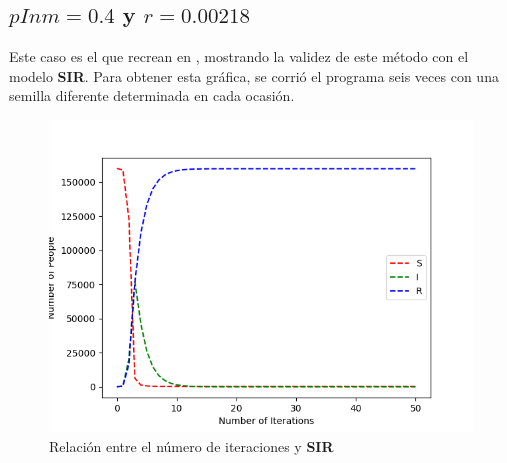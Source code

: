\documentclass[twoside,twocolumn]{article}
\begin{document}
\subsection{$pInm=0.4$ y $r=0.00218$}
Este caso es el que recrean en \cite{b1}, mostrando la validez de este método con el modelo \textbf{SIR}. Para obtener esta gráfica, se corrió el programa seis veces con una semilla diferente determinada en cada ocasión.
\begin{figure}[H]
\includegraphics[width=.5\textwidth]{IterationsVSNumber}
\caption{Relación entre el número de iteraciones y \textbf{SIR}}
\end{figure}
\end{document}
